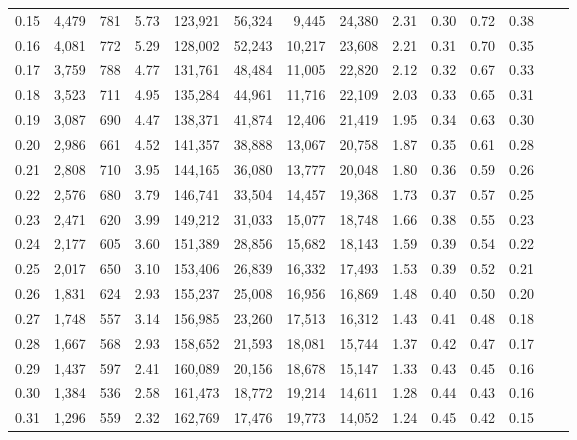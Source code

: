 \begin{tabular}{rrrrrrrrrrrrrr}
0.15 &   4,479 &  781 &    5.73 &  123,921 &   56,324 &   9,445 &  24,380 &  2.31 &  0.30 &  0.72 &      0.38 \\
0.16 &   4,081 &  772 &    5.29 &  128,002 &   52,243 &  10,217 &  23,608 &  2.21 &  0.31 &  0.70 &      0.35 \\
0.17 &   3,759 &  788 &    4.77 &  131,761 &   48,484 &  11,005 &  22,820 &  2.12 &  0.32 &  0.67 &      0.33 \\
0.18 &   3,523 &  711 &    4.95 &  135,284 &   44,961 &  11,716 &  22,109 &  2.03 &  0.33 &  0.65 &      0.31 \\
0.19 &   3,087 &  690 &    4.47 &  138,371 &   41,874 &  12,406 &  21,419 &  1.95 &  0.34 &  0.63 &      0.30 \\
0.20 &   2,986 &  661 &    4.52 &  141,357 &   38,888 &  13,067 &  20,758 &  1.87 &  0.35 &  0.61 &      0.28 \\
0.21 &   2,808 &  710 &    3.95 &  144,165 &   36,080 &  13,777 &  20,048 &  1.80 &  0.36 &  0.59 &      0.26 \\
0.22 &   2,576 &  680 &    3.79 &  146,741 &   33,504 &  14,457 &  19,368 &  1.73 &  0.37 &  0.57 &      0.25 \\
0.23 &   2,471 &  620 &    3.99 &  149,212 &   31,033 &  15,077 &  18,748 &  1.66 &  0.38 &  0.55 &      0.23 \\
0.24 &   2,177 &  605 &    3.60 &  151,389 &   28,856 &  15,682 &  18,143 &  1.59 &  0.39 &  0.54 &      0.22 \\
0.25 &   2,017 &  650 &    3.10 &  153,406 &   26,839 &  16,332 &  17,493 &  1.53 &  0.39 &  0.52 &      0.21 \\
0.26 &   1,831 &  624 &    2.93 &  155,237 &   25,008 &  16,956 &  16,869 &  1.48 &  0.40 &  0.50 &      0.20 \\
0.27 &   1,748 &  557 &    3.14 &  156,985 &   23,260 &  17,513 &  16,312 &  1.43 &  0.41 &  0.48 &      0.18 \\
0.28 &   1,667 &  568 &    2.93 &  158,652 &   21,593 &  18,081 &  15,744 &  1.37 &  0.42 &  0.47 &      0.17 \\
0.29 &   1,437 &  597 &    2.41 &  160,089 &   20,156 &  18,678 &  15,147 &  1.33 &  0.43 &  0.45 &      0.16 \\
0.30 &   1,384 &  536 &    2.58 &  161,473 &   18,772 &  19,214 &  14,611 &  1.28 &  0.44 &  0.43 &      0.16 \\
0.31 &   1,296 &  559 &    2.32 &  162,769 &   17,476 &  19,773 &  14,052 &  1.24 &  0.45 &  0.42 &      0.15 \\

\end{tabular}
